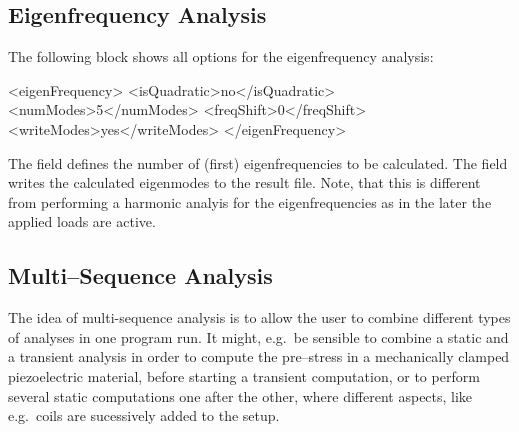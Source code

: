 \subsection{Eigenfrequency Analysis}
%
The following block shows all options for the eigenfrequency analysis:
\begin{xmllisting}
<eigenFrequency>
  <isQuadratic>no</isQuadratic>
  <numModes>5</numModes>
  <freqShift>0</freqShift>
  <writeModes>yes</writeModes>
</eigenFrequency>
\end{xmllisting}
\noindent
The field  defines the number of (first) eigenfrequencies
to be calculated.
The field  writes the calculated eigenmodes to the
result file. Note, that this is different from performing a harmonic analyis
for the eigenfrequencies as in the later the applied loads are active.

%

%
\subsection{Multi--Sequence Analysis}
%
The idea of multi-sequence analysis is to allow the user to combine different
types of analyses in one program run. It might, e.g.~be sensible to combine a
static and a transient analysis in order to compute the pre--stress in a
mechanically clamped piezoelectric material, before starting a transient
computation, or to perform several static computations one after the other,
where different aspects, like e.g.~coils are sucessively added to the setup.

